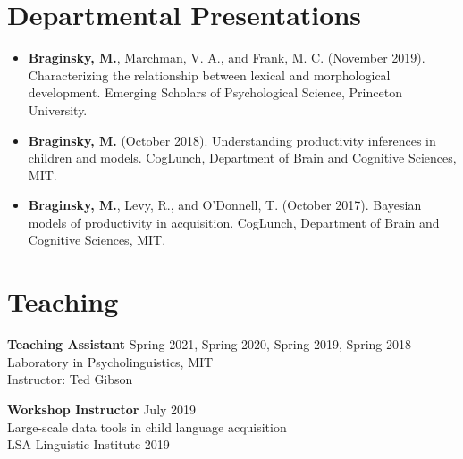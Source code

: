 \documentclass[11pt,]{article}
\begin{document}
\hypertarget{departmental-presentations}{%
\section{Departmental Presentations}\label{departmental-presentations}}

\begin{itemize}
\item
  \textbf{Braginsky, M.}, Marchman, V. A., and Frank, M. C. (November
  2019). Characterizing the relationship between lexical and
  morphological development. Emerging Scholars of Psychological Science,
  Princeton University.
\item
  \textbf{Braginsky, M.} (October 2018). Understanding productivity
  inferences in children and models. CogLunch, Department of Brain and
  Cognitive Sciences, MIT.
\item
  \textbf{Braginsky, M.}, Levy, R., and O'Donnell, T. (October 2017).
  Bayesian models of productivity in acquisition. CogLunch, Department
  of Brain and Cognitive Sciences, MIT.
\end{itemize}

\hypertarget{teaching}{%
\section{Teaching}\label{teaching}}

\textbf{Teaching Assistant} \hfill Spring 2021, Spring 2020, Spring
2019, Spring 2018\\
\hspace*{0.333em}\hspace*{0.333em}\hspace*{0.333em}\hspace*{0.333em}Laboratory
in Psycholinguistics, MIT\\
\hspace*{0.333em}\hspace*{0.333em}\hspace*{0.333em}\hspace*{0.333em}Instructor:
Ted Gibson

\textbf{Workshop Instructor} \hfill July 2019\\
\hspace*{0.333em}\hspace*{0.333em}\hspace*{0.333em}\hspace*{0.333em}Large-scale
data tools in child language acquisition\\
\hspace*{0.333em}\hspace*{0.333em}\hspace*{0.333em}\hspace*{0.333em}LSA
Linguistic Institute 2019
\end{document}
